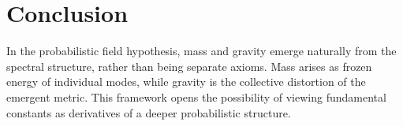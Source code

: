\documentclass[12pt,a4paper]{article}
\begin{document}
\section{Conclusion}
In the probabilistic field hypothesis, mass and gravity emerge naturally from the spectral structure, rather than being separate axioms. Mass arises as frozen energy of individual modes, while gravity is the collective distortion of the emergent metric. This framework opens the possibility of viewing fundamental constants as derivatives of a deeper probabilistic structure.
\end{document}

